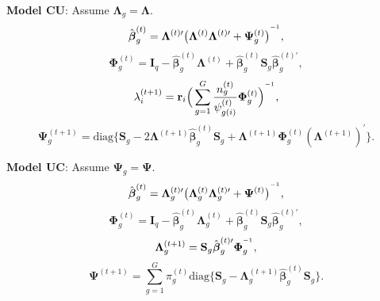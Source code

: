 \documentclass[12pt]{article}
\newcommand{\vecI}{\mathbf{I}}
\newcommand{\inv}{^{\raisebox{.2ex}{$\scriptscriptstyle-1$}}}
\begin{document}
\textbf{Model CU}: Assume $\mathbf{\Lambda}_g = \mathbf{\Lambda}$.
\begin{equation*}
\hat{\boldsymbol{\beta}}_g^{(t)} = \mathbf{\Lambda}^{(t) \prime} \big(\mathbf{\Lambda}^{(t)} \mathbf{\Lambda}^{(t) \prime} + \mathbf{\Psi}_g^{(t)} \big)^{\inv},
\end{equation*}
\begin{equation*}
\mathbf{\Phi}_g^{(t)} = \vecI_q - \hat{\boldsymbol{\beta}}_g^{(t)} \mathbf{\Lambda}^{(t)} +  \hat{\boldsymbol{\beta}}_g^{(t)} \mathbf{S}_g \hat{\boldsymbol{\beta}}_g^{(t) \prime},
\end{equation*}
\begin{equation*}
\mathbf{\lambda}_i^{(t+1)}  = \mathbf{r}_i \Big( \sum_{g=1}^G \frac{n_g^{(t)}}{\psi^{(t)}_{g(i)}} \mathbf{\Phi}_g^{(t)} \Big)^{\inv},
\end{equation*}
\begin{equation*}
\mathbf{\Psi}_g^{(t+1)} = \text{diag}\{\mathbf{S}_g - 2 \mathbf{\Lambda}^{(t+1)}\hat{\boldsymbol{\beta}}_g^{(t)} \mathbf{S}_g + \mathbf{\Lambda}^{(t+1)} \mathbf{\Phi}_g^{(t)} ( \mathbf{\Lambda}^{(t+1)})^{\prime} \}.
\end{equation*}

\textbf{Model UC}: Assume $\mathbf{\Psi}_g = \mathbf{\Psi}$.
\begin{equation*}
\hat{\boldsymbol{\beta}}_g^{(t)} = \mathbf{\Lambda}_g^{(t) \prime} \big(\mathbf{\Lambda}_g^{(t)} \mathbf{\Lambda}_g^{(t) \prime} + \mathbf{\Psi}^{(t)} \big)^{\inv},
\end{equation*}
\begin{equation*}
\mathbf{\Phi}_g^{(t)} = \vecI_q - \hat{\boldsymbol{\beta}}_g^{(t)} \mathbf{\Lambda}_g^{(t)} +  \hat{\boldsymbol{\beta}}_g^{(t)} \mathbf{S}_g \hat{\boldsymbol{\beta}}_g^{(t) \prime},
\end{equation*}
\begin{equation*}
\mathbf{\Lambda}_g^{(t+1)} = \mathbf{S}_g \hat{\boldsymbol{\beta}}_g^{(t) \prime}{\mathbf{\Phi}}_g^{\inv},
\end{equation*}
\begin{equation*}
\mathbf{\Psi}^{(t+1)} = \sum_{g=1}^G \pi_g^{(t)} \text{diag}\{\mathbf{S}_g - \mathbf{\Lambda}_g^{(t+1)}\hat{\boldsymbol{\beta}}_g^{(t)} \mathbf{S}_g\}.
\end{equation*}
\end{document}
